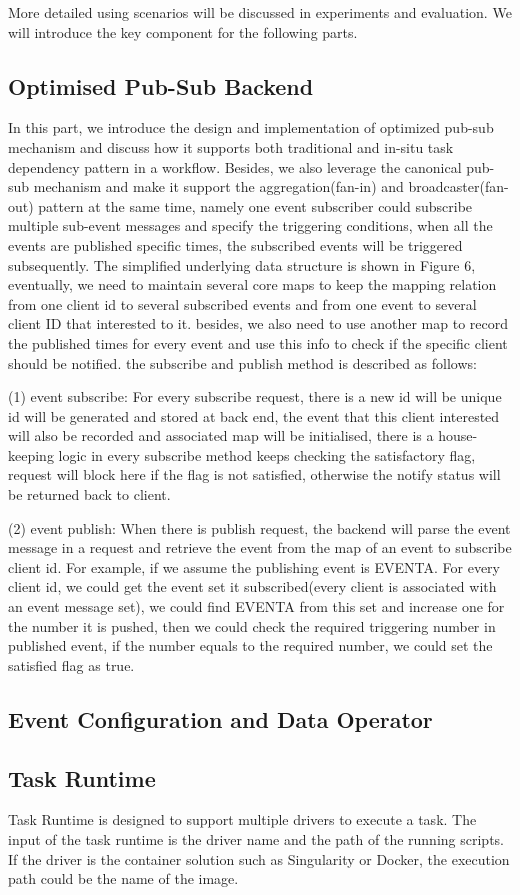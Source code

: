 More detailed using scenarios will be discussed in experiments and evaluation. We will introduce the key component for the following parts. 

\subsection{Optimised Pub-Sub Backend}

In this part, we introduce the design and implementation of optimized pub-sub mechanism and discuss how it supports both traditional and in-situ task dependency pattern in a workflow. Besides, we also leverage the canonical pub-sub mechanism and make it support the aggregation(fan-in) and broadcaster(fan-out) pattern at the same time, namely one event subscriber could subscribe multiple sub-event messages and specify the triggering conditions, when all the events are published specific times, the subscribed events will be triggered subsequently. The simplified underlying data structure is shown in Figure 6, eventually, we need to maintain several core maps to keep the mapping relation from one client id to several subscribed events and from one event to several client ID that interested to it. besides, we also need to use another map to record the published times for every event and use this info to check if the specific client should be notified. the subscribe and publish method is described as follows:

(1) event subscribe: For every subscribe request, there is a new id will be unique id will be generated and stored at back end, the event that this client interested will also be recorded and associated map will be initialised, there is a house-keeping logic in every subscribe method keeps checking the satisfactory flag, request will block here if the flag is not satisfied, otherwise the notify status will be returned back to client.

(2) event publish: When there is publish request, the backend will parse the event message in a request and retrieve the event from the map of an event to subscribe client id. For example, if we assume the publishing event is EVENTA. For every client id, we could get the event set it subscribed(every client is associated with an event message set), we could find EVENTA from this set and increase one for the number it is pushed, then we could check the required triggering number in published event, if the number equals to the required number, we could set the satisfied flag as true.

\subsection{Event Configuration and Data Operator}


\subsection{Task Runtime}
Task Runtime is designed to support multiple drivers to execute a task. The input of the task runtime is the driver name and the path of the running scripts. If the driver is the container solution such as Singularity or Docker, the execution path could be the name of the image.

